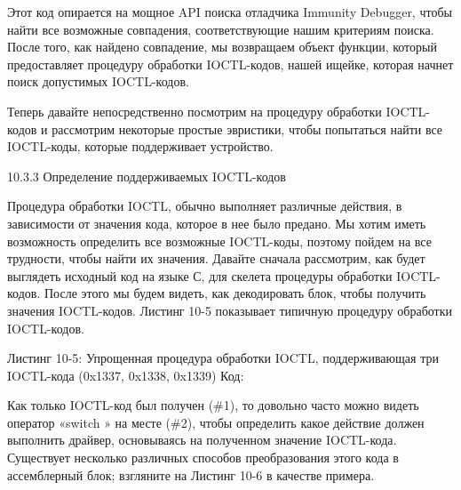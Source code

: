 \documentclass[12pt]{book}
\begin{document}
Этот код опирается на мощное API поиска отладчика Immunity Debugger, чтобы найти все возможные совпадения, соответствующие нашим критериям поиска. После того, как найдено совпадение, мы возвращаем объект функции, который предоставляет процедуру обработки IOCTL-кодов, нашей ищейке, которая начнет поиск допустимых IOCTL-кодов.

Теперь давайте непосредственно посмотрим на процедуру обработки IOCTL-кодов и рассмотрим некоторые простые эвристики, чтобы попытаться найти все IOCTL-коды, которые поддерживает устройство. 

10.3.3 Определение поддерживаемых IOCTL-кодов

Процедура обработки IOCTL, обычно выполняет различные действия, в зависимости от значения кода, которое в нее было предано. Мы хотим иметь возможность определить все возможные IOCTL-коды, поэтому пойдем на все трудности, чтобы найти их значения. Давайте сначала рассмотрим, как будет выглядеть исходный код на языке С, для скелета процедуры обработки IOCTL-кодов. После этого мы будем видеть, как декодировать блок, чтобы получить значения IOCTL-кодов. Листинг 10-5 показывает типичную процедуру обработки IOCTL-кодов.

Листинг 10-5: Упрощенная процедура обработки IOCTL, поддерживающая три IOCTL-кода (0x1337, 0x1338, 0x1339)
Код:





        
Как только IOCTL-код был получен (\#1), то довольно часто можно видеть оператор «switch {}» на месте (\#2), чтобы определить какое действие должен выполнить драйвер, основываясь на полученном значение IOCTL-кода. Существует несколько различных способов преобразования этого кода в ассемблерный блок; взгляните на Листинг 10-6 в качестве примера.
\end{document}
